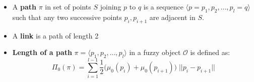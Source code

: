 \begin{itemize}
  \item A \textbf{path} $\pi$ in set of points $S$ joining $p$ to $q$ is a sequence $\langle p = p_1, p_2, \ldots, p_l = q \rangle$ such that any two successive points $p_i, p_{i+1}$ are adjacent in $S$.
  \item A \textbf{link} is a path of length 2
  \item \textbf{Length of a path} $\pi = \langle p_1, p_2, \ldots, p_l \rangle$ in a fuzzy object $\mathcal{O}$ is defined as:
    \begin{equation*}
      \Pi_0(\pi) = \sum_{i=1}^{l-1} \frac{1}{2} \Big(\mu_0(p_i) + \mu_0(p_{i+1})\Big) \; || p_i - p_{i+1} ||
    \end{equation*}
\end{itemize}
